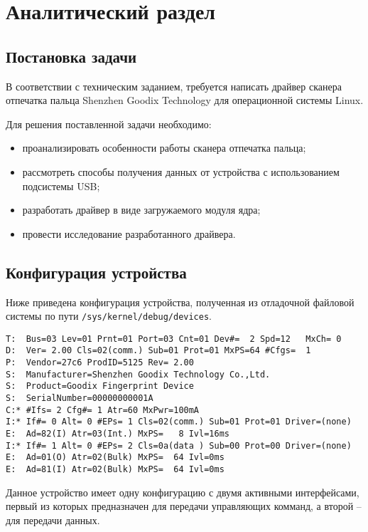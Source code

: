 \chapter{Аналитический раздел}

\section{Постановка задачи}

В соответствии с техническим заданием, требуется написать драйвер сканера отпечатка пальца Shenzhen Goodix Technology для операционной системы Linux.

Для решения поставленной задачи необходимо:

\begin{itemize}[label=---]
    \item проанализировать особенности работы сканера отпечатка пальца;
    \item рассмотреть способы получения данных от устройства с использованием подсистемы USB;
    \item разработать драйвер в виде загружаемого модуля ядра;
    \item провести исследование разработанного драйвера.
\end{itemize}

\section{Конфигурация устройства}

Ниже приведена конфигурация устройства, полученная из отладочной файловой системы по пути \texttt{/sys/kernel/debug/devices}.

\begin{verbatim}
T:  Bus=03 Lev=01 Prnt=01 Port=03 Cnt=01 Dev#=  2 Spd=12   MxCh= 0
D:  Ver= 2.00 Cls=02(comm.) Sub=01 Prot=01 MxPS=64 #Cfgs=  1
P:  Vendor=27c6 ProdID=5125 Rev= 2.00
S:  Manufacturer=Shenzhen Goodix Technology Co.,Ltd.
S:  Product=Goodix Fingerprint Device
S:  SerialNumber=00000000001A
C:* #Ifs= 2 Cfg#= 1 Atr=60 MxPwr=100mA
I:* If#= 0 Alt= 0 #EPs= 1 Cls=02(comm.) Sub=01 Prot=01 Driver=(none)
E:  Ad=82(I) Atr=03(Int.) MxPS=   8 Ivl=16ms
I:* If#= 1 Alt= 0 #EPs= 2 Cls=0a(data ) Sub=00 Prot=00 Driver=(none)
E:  Ad=01(O) Atr=02(Bulk) MxPS=  64 Ivl=0ms
E:  Ad=81(I) Atr=02(Bulk) MxPS=  64 Ivl=0ms
\end{verbatim}

Данное устройство имеет одну конфигурацию с двумя активными интерфейсами, первый из которых предназначен для передачи управляющих комманд, а второй -- для передачи данных.

